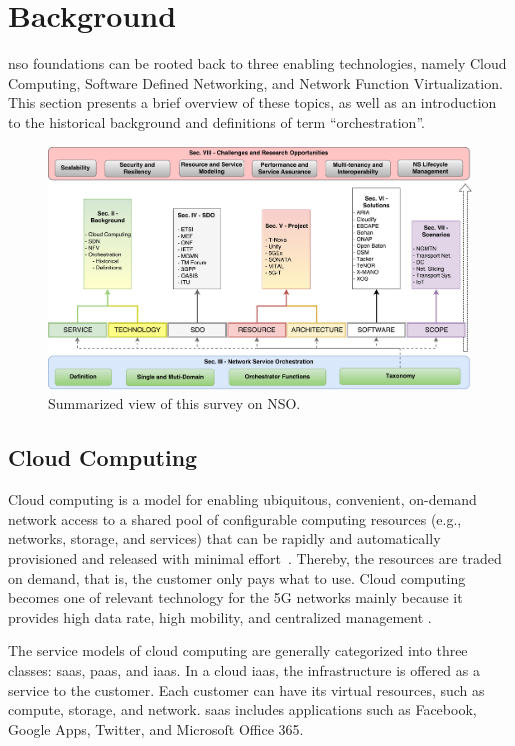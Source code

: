 \section{Background}
\label{sec:background}

\gls{nso} foundations can be rooted back to three enabling technologies, namely Cloud Computing, Software Defined Networking, and Network Function Virtualization. This section presents a brief overview of these topics, as well as an introduction to the historical background and definitions of term ``orchestration''.

\begin{figure}[th]
  \centering
  \includegraphics[scale=.4]{Figures/01_Introduction/Organization}
    \caption{Summarized view of this survey on NSO.}
    \label{org}
\end{figure}

\subsection{Cloud Computing}
Cloud computing is a model for enabling ubiquitous, convenient, on-demand network access to a shared pool of configurable computing resources (e.g., networks, storage, and services) that can be rapidly and automatically provisioned and released with minimal effort~\cite{Mell2011TheTechnology}. Thereby, the resources are traded on demand, that is, the customer only pays what to use. Cloud computing becomes one of relevant technology for the 5G networks mainly because it provides high data rate, high mobility, and centralized management \cite{Le2016SurveyNetworks}.

The service models of cloud computing  are generally categorized into three classes: \gls{saas}, \gls{paas}, and \gls{iaas}. In a cloud \gls{iaas}, the infrastructure is offered as a service to the customer. Each customer can have its virtual resources, such as compute, storage, and network. 
\gls{saas} includes applications such as Facebook, Google Apps, Twitter, and Microsoſt Office 365.

